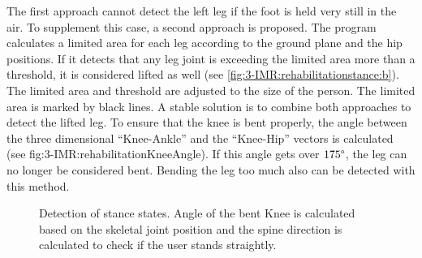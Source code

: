 The first approach cannot detect the left leg if the foot is held very still in the air. To supplement this case, a second approach is proposed. The program calculates a limited area for each leg according to the ground plane and the hip positions. If it detects that any leg joint is exceeding the limited area more than a threshold, it is considered lifted as well (see \figurename{\ref{fig:3-IMR:rehabilitationstance:b}}). The limited area and threshold are adjusted to the size of the person. 
The limited area is marked by black lines. 
A stable solution is to combine both approaches to detect the lifted leg.
To ensure that the knee is bent properly, the angle between the three dimensional ``Knee-Ankle'' and the ``Knee-Hip'' vectors is calculated (see \figurename{fig:3-IMR:rehabilitationKneeAngle}). If this angle gets over $175\degree$, the leg can no longer be considered bent. Bending the leg too much also can be detected with this method.
\begin{figure}
	\centering
	\quad
	\caption{Detection of stance states. Angle of the bent Knee is calculated based on the skeletal joint position and the spine direction is calculated to check if the user stands straightly.}
	\label{fig:3-IMR:poseDetection}
\end{figure}

